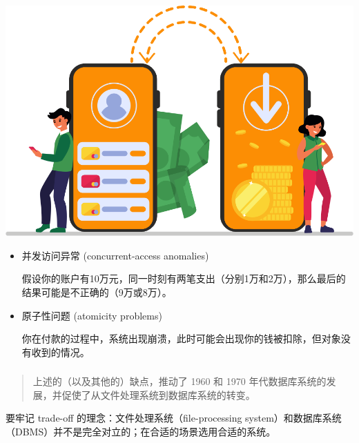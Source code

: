 \documentclass[aspectratio=169, 14pt]{beamer}
\begin{document}
\begin{frame}
    \begin{center}
        \includegraphics[height=.4\paperheight]{image/money}
    \end{center}
    \begin{itemize}
        \item \alert{并发访问异常
        } (concurrent-access anomalies)

        假设你的账户有10万元，同一时刻有两笔支出（分别1万和2万），那么最后的结果可能是不正确的（9万或8万）。
        \item \alert{原子性问题} (atomicity problems)
        
        你在付款的过程中，系统出现崩溃，此时可能会出现你的钱被扣除，但对象没有收到的情况。
    \end{itemize}

\end{frame}

\begin{frame}
    \frametitle{}

    \begin{quote}
        上述的（以及其他的）缺点，推动了 1960 和 1970 年代数据库系统的发展，并促使了从\alert{文件处理系统}到\alert{数据库系统}的转变。
    \end{quote}

    \begin{center}
        {\Huge {}  }
    \end{center}

    \pause
{} 要牢记 trade-off 的理念：文件处理系统（file-processing system）和数据库系统（DBMS）并不是完全对立的；在合适的场景选用合适的系统。
\end{frame}
\end{document}
